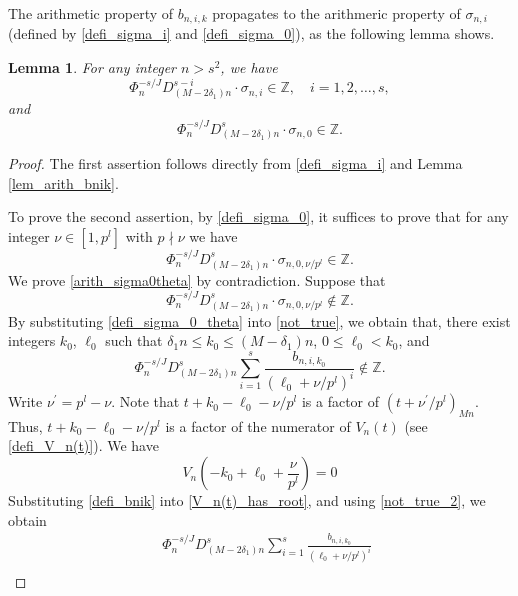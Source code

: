 \documentclass[12pt]{article}
\newtheorem{lemma}[theorem]{Lemma}
\numberwithin{equation}{section}
\begin{document}
\bigskip

The arithmetic property of $b_{n,i,k}$ propagates to the arithmeric property of $\sigma_{n,i}$ (defined by \eqref{defi_sigma_i} and \eqref{defi_sigma_0}), as the following lemma shows.

\begin{lemma}\label{lem_arith_sigmai}
For any integer $n > s^2$, we have
\[ \Phi_n^{-s/J} D_{(M-2\delta_1)n}^{s-i} \cdot \sigma_{n,i} \in \mathbb{Z}, \quad i=1,2,\ldots,s, \]
and
\[ \Phi_n^{-s/J} D_{(M-2\delta_1)n}^{s} \cdot \sigma_{n,0} \in \mathbb{Z}. \]
\end{lemma}

\begin{proof}
The first assertion follows directly from \eqref{defi_sigma_i} and Lemma \ref{lem_arith_bnik}.

To prove the second assertion, by \eqref{defi_sigma_0}, it suffices to prove that for any integer $\nu \in [1,p^l]$ with $p \nmid \nu$ we have
\begin{equation}\label{arith_sigma0theta}
	\Phi_n^{-s/J} D_{(M-2\delta_1)n}^{s} \cdot \sigma_{n,0,\nu/p^l} \in \mathbb{Z}.
\end{equation} 
We prove \eqref{arith_sigma0theta} by contradiction. Suppose that 
\begin{equation}\label{not_true}
	\Phi_n^{-s/J} D_{(M-2\delta_1)n}^{s} \cdot \sigma_{n,0,\nu/p^l} \notin \mathbb{Z}.
\end{equation}
By substituting \eqref{defi_sigma_0_theta} into \eqref{not_true}, we obtain that, there exist integers $k_0$, $\ell_0$ such that $\delta_1 n \leqslant k_0 \leqslant (M-\delta_1)n$, $0 \leqslant \ell_0 < k_0$, and
\begin{equation}\label{not_true_2}
\Phi_n^{-s/J} D_{(M-2\delta_1)n}^{s} \sum_{i=1}^{s} \frac{b_{n,i,k_0}}{(\ell_0+\nu/p^l)^{i}} \notin \mathbb{Z}.
\end{equation}
Write $\nu^{\prime} = p^l - \nu$. Note that $t+k_0-\ell_0-\nu/p^l$ is a factor of $(t+\nu^{\prime}/p^l)_{Mn}$. Thus, $t+k_0-\ell_0-\nu/p^l$ is a factor of the numerator of $V_n(t)$ (see \eqref{defi_V_n(t)}). We have
\begin{equation}\label{V_n(t)_has_root}
	V_n\left(-k_0+\ell_0+\frac{\nu}{p^l} \right) = 0
\end{equation}
Substituting \eqref{defi_bnik} into \eqref{V_n(t)_has_root}, and using \eqref{not_true_2}, we obtain
\begin{align*}
&~ \Phi_n^{-s/J} D_{(M-2\delta_1)n}^{s} \sum_{i=1}^{s} \frac{b_{n,i,k_0}}{(\ell_0+\nu/p^l)^{i}} \\

\end{align*}
\end{proof}
\end{document}
